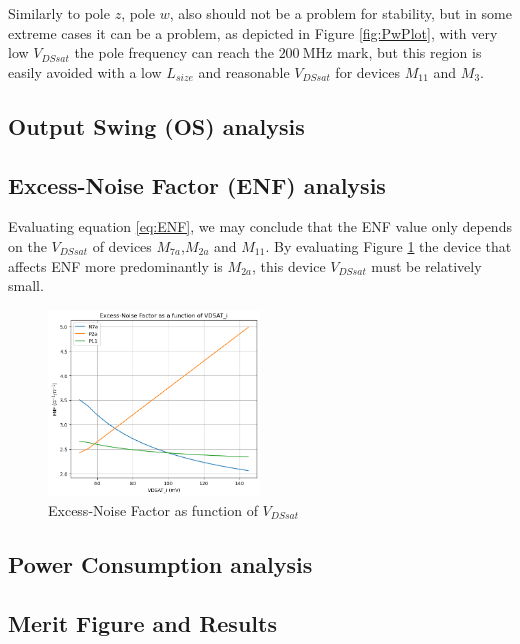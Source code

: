 Similarly to pole $z$, pole $w$, also should not be a problem for stability, but in some extreme cases it can be a problem, as depicted in Figure \ref{fig:PwPlot}, with very low $V_{DSsat}$ the pole frequency can reach the $\SI{200}{\mega\hertz}$ mark, but this region is easily avoided with a low $L_{size}$ and reasonable $V_{DSsat}$ for devices $M_{11}$ and $M_3$.

\subsection{Output Swing (OS) analysis}



\subsection{Excess-Noise Factor (ENF) analysis}

Evaluating equation \ref{eq:ENF}, we may conclude that the ENF value only depends on the $V_{DSsat}$ of devices $M_{7a}$,$M_{2a}$ and $M_{11}$. By evaluating Figure \ref{fig:enfVariation} the device that affects ENF more predominantly is $M_{2a}$, this device $V_{DSsat}$ must be relatively small.

\begin{figure}[H]
    \centering
    \includegraphics[width=0.5\textwidth]{Images/enfVariation.png}
    \caption{Excess-Noise Factor as function of $V_{DSsat}$}
    \label{fig:enfVariation}
\end{figure}

\subsection{Power Consumption analysis}

\subsection{Merit Figure and Results}


